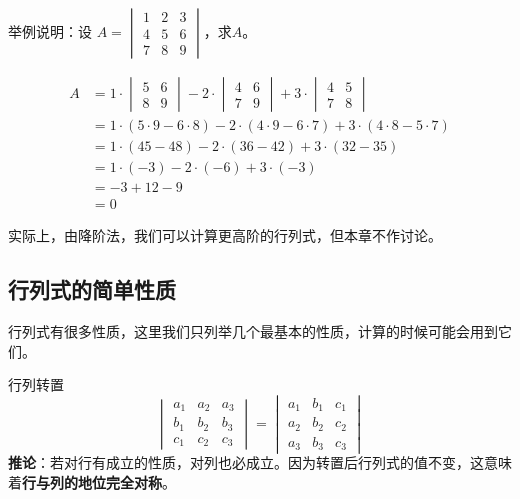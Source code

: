 \begin{myexample}
  举例说明：设 $A = \begin{vmatrix}
    1 & 2 & 3 \\
    4 & 5 & 6 \\
    7 & 8 & 9
  \end{vmatrix}$，求$A$。

  \begin{align*}
    A &= 1 \cdot \begin{vmatrix} 5 & 6 \\ 8 & 9 \end{vmatrix}
        - 2 \cdot \begin{vmatrix} 4 & 6 \\ 7 & 9 \end{vmatrix}
        + 3 \cdot \begin{vmatrix} 4 & 5 \\ 7 & 8 \end{vmatrix} \\
      &= 1 \cdot (5\cdot 9 - 6\cdot 8) - 2 \cdot (4\cdot 9 - 6\cdot 7) + 3 \cdot (4\cdot 8 - 5\cdot 7) \\
      &= 1 \cdot (45 - 48) - 2 \cdot (36 - 42) + 3 \cdot (32 - 35) \\
      &= 1 \cdot (-3) - 2 \cdot (-6) + 3 \cdot (-3) \\
      &= -3 + 12 - 9 \\
      &= 0
  \end{align*}
\end{myexample}

实际上，由降阶法，我们可以计算更高阶的行列式，但本章不作讨论。

\subsection{行列式的简单性质}
行列式有很多性质，这里我们只列举几个最基本的性质，计算的时候可能会用到它们。

\begin{theorem}{行列转置}{}
\[
\begin{vmatrix}
a_1 & a_2 & a_3 \\
b_1 & b_2 & b_3 \\
c_1 & c_2 & c_3
\end{vmatrix}
=
\begin{vmatrix}
a_1 & b_1 & c_1 \\
a_2 & b_2 & c_2 \\
a_3 & b_3 & c_3
\end{vmatrix}
\]
\textbf{推论}：若对行有成立的性质，对列也必成立。因为转置后行列式的值不变，这意味着\textbf{行与列的地位完全对称}。
\end{theorem}

